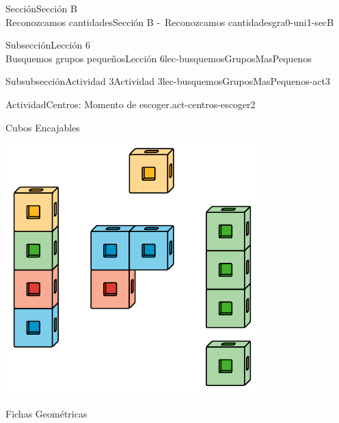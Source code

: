 \begin{sectionptx}{Sección}{{\Large Sección B\\}Reconozcamos cantidades}{}{Sección B -~Reconozcamos cantidades}{}{}{gra0-uni1-secB}
\begin{subsectionptx}{Subsección}{{\normalsize Lección 6\\[-0.05cm]}Busquemos grupos pequeños}{}{Lección 6}{}{}{lec-busquemosGruposMasPequenos}
%
%
\typeout{************************************************}
\typeout{************************************************}
%
\clearpage
\begin{subsubsectionptx}{Subsubsección}{Actividad 3}{}{Actividad 3}{}{}{lec-busquemosGruposMasPequenos-act3}
\begin{activity}{Actividad}{Centros: Momento de escoger.}{act-centros-escoger2}%
\begin{sidebyside}{2}{0.025}{0.025}{0.05}%
\begin{sbspanel}{0.45}%
Cubos Encajables%
\par
\includegraphics[max width=\linewidth, center]{external/svg-source/tikz-file-128850.pdf}
\end{sbspanel}%
\begin{sbspanel}{0.45}%
Fichas Geométricas%
\par

\end{sbspanel}
\end{sidebyside}
\end{activity}
\end{subsubsectionptx}
\end{subsectionptx}
\end{sectionptx}
